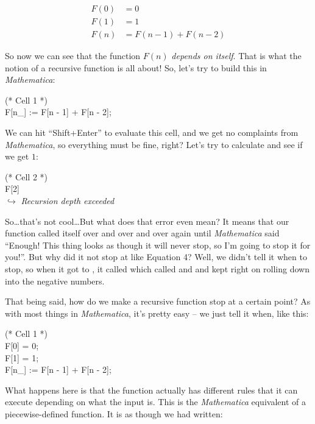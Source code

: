 \begin{align} 
	   F(0) &= 0 \\
	   F(1) &= 1 \\
	   F(n) &= F(n - 1) + F(n - 2)
\end{align}

So now we can see that the function $F(n)$ \emph{depends on itself}. That is what the notion of a recursive function is all about! So, let's try to build this in \emph{Mathematica}:

\begin{code}
	   (* Cell 1 *) \\
	   F[n\_] := F[n - 1] + F[n - 2];
\end{code}

We can hit ``Shift+Enter'' to evaluate this cell, and we get no complaints from \emph{Mathematica}, so everything must be fine, right? Let's try to calculate  and see if we get $1$:

\begin{code}
	   (* Cell 2 *)\\
	   F[2]\\
	   $\hookrightarrow$ \emph{Recursion depth exceeded}
\end{code}

So\ldots that's not cool\ldots But what does that error even mean? It means that our function  called itself over and over and over again until \emph{Mathematica} said ``Enough! This thing looks as though it will never stop, so I'm going to stop it for you!''. But why did it not stop at  like Equation 4? Well, we didn't tell it when to stop, so when it got to , it called  which called  and  and kept right on rolling down into the negative numbers.

That being said, how do we make a recursive function stop at a certain point? As with most things in \emph{Mathematica}, it's pretty easy -- we just tell it when, like this:

\begin{code}
	   (* Cell 1 *)\\
	   F[0] = 0;\\
	   F[1] = 1;\\
	   F[n\_] := F[n - 1] + F[n - 2];
\end{code}

What happens here is that the function  actually has different rules that it can execute depending on what the input is. This is the \emph{Mathematica} equivalent of a piecewise-defined function. It is as though we had written:

